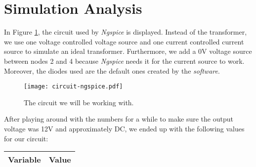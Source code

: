 \clearpage

\section{Simulation Analysis}
\label{sec:simulation}

In Figure \ref{fig:circuit-ngspice}, the circuit used by \textit{Ngspice} is displayed. Instead of the transformer, we use one voltage controlled voltage source and one current controlled current source to simulate an ideal transformer. Furthermore, we add a 0V voltage source between nodes 2 and 4 because \textit{Ngspice} needs it for the current source to work. Moreover, the diodes used are the default ones created by the \textit{software}.

\begin{figure}[h] \centering
\texttt{[image: circuit-ngspice.pdf]}
\caption{The circuit we will be working with.}
\label{fig:circuit-ngspice}
\end{figure}

After playing around with the numbers for a while to make sure the output voltage was 12V and approximately DC, we ended up with the following values for our circuit:

\begin{tabular}{|l|r|}
  \hline    
  {\bf Variable} & {\bf Value} \\ \hline
  
\end{tabular}